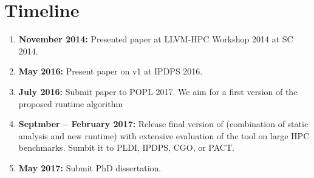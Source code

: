 \section{Timeline}
\label{sec:timeline}

\begin{enumerate}
\item \textbf{November 2014:} Presented paper at LLVM-HPC Workshop 2014 at SC
  2014.
\item \textbf{May 2016:} Present paper on \archer v1 at IPDPS 2016.
\item \textbf{July 2016:} Submit paper to POPL 2017. We aim for a first
  version of the proposed runtime algorithm
\item \textbf{Septmber -- February 2017:} Release final version of \archer
  (combination of static analysis and new runtime) with extensive evaluation
  of the tool on large HPC benchmarks.
  Sumbit it to PLDI, IPDPS, CGO, or PACT.
\item \textbf{May 2017:} Submit PhD dissertation.
\end{enumerate}

